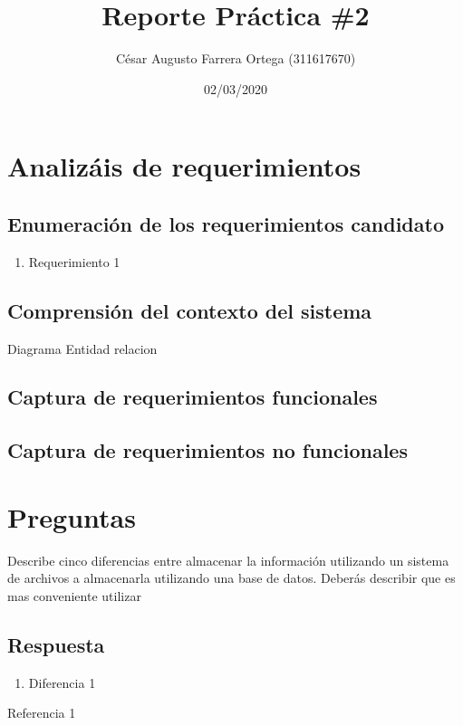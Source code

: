 \documentclass[
	10pt, %
	spanish %
]{fphw}
\title{Reporte Práctica \#2} %
\author{César Augusto Farrera Ortega (311617670)} %
\date{02/03/2020} %
\institute{UNAM \\ Facultad de Ciencias} %
\begin{document}
\maketitle %


\section*{Analizáis de requerimientos}


\subsection*{Enumeración de los requerimientos candidato}
\begin{enumerate}
	\item Requerimiento 1
\end{enumerate}

\subsection*{Comprensión del contexto del sistema}

Diagrama Entidad relacion

\subsection*{Captura de requerimientos funcionales}

\subsection*{Captura de requerimientos no funcionales}


\section*{Preguntas}

\begin{problem}
Describe cinco diferencias entre almacenar la información utilizando un sistema de archivos a almacenarla utilizando una base
de datos. Deberás describir que es mas conveniente utilizar
\end{problem}

\subsection*{Respuesta}

\begin{enumerate}
	\item Diferencia 1
\end{enumerate}


\begin{thebibliography}{1}
  		\bibitem {}Referencia 1
  		
\end{thebibliography}
\end{document}
